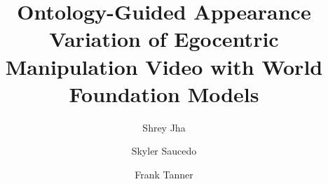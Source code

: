 \documentclass[runningheads]{llncs}
\begin{document}
\title{Ontology-Guided Appearance Variation of Egocentric Manipulation Video with World Foundation Models}

\author{Shrey Jha \and Skyler Saucedo \and Frank Tanner}


\maketitle










\appendix




\end{document}
